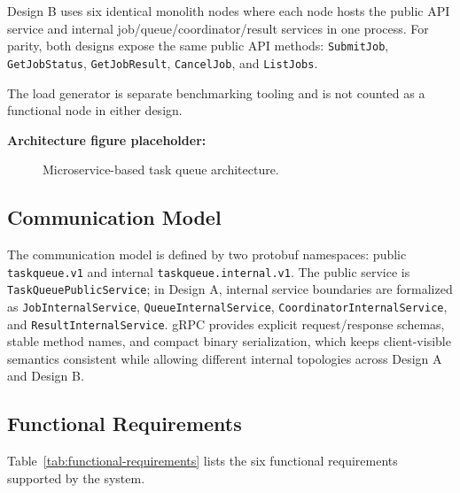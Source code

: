 \documentclass[11pt]{article}
\begin{document}
\noindent
Design B uses six identical monolith nodes where each node hosts the public API service and internal job/queue/coordinator/result services in one process.
For parity, both designs expose the same public API methods: \texttt{SubmitJob}, \texttt{GetJobStatus}, \texttt{GetJobResult}, \texttt{CancelJob}, and \texttt{ListJobs}.

\noindent
The load generator is separate benchmarking tooling and is not counted as a functional node in either design.

\noindent
\textbf{Architecture figure placeholder:}
\begin{figure}[H]
    \centering
    \caption{Microservice-based task queue architecture.}
    \label{fig:architecture}
\end{figure}

\subsection{Communication Model}
The communication model is defined by two protobuf namespaces: public \texttt{taskqueue.v1} and internal \texttt{taskqueue.internal.v1}.
The public service is \texttt{TaskQueuePublicService}; in Design A, internal service boundaries are formalized as \texttt{JobInternalService}, \texttt{QueueInternalService}, \texttt{CoordinatorInternalService}, and \texttt{ResultInternalService}.
gRPC provides explicit request/response schemas, stable method names, and compact binary serialization, which keeps client-visible semantics consistent while allowing different internal topologies across Design A and Design B.

\subsection{Functional Requirements}
Table~\ref{tab:functional-requirements} lists the six functional requirements supported by the system.
\end{document}
